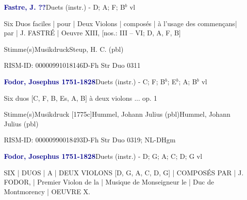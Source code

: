 \documentclass[twocolumn, 12pt]{book}
\begin{document}
\par \vspace{16pt} \textcolor{darkblue}{\textbf{Fastre, J.  ??}}\hfillplus{\textbf{[269]}}\newline Duets (instr.) - D; A; F; B$^b$ vl
\par \begin{itshape}Six Duos faciles | pour | Deux Violons | composés | à l'usage des commençans| par | J. FASTRÉ | Oeuvre XIII, [nos.: III – VI; D, A, F, B]\end{itshape} 
\par \textcolor{darkblue}{}  Stimme(s)\newline Musikdruck\newline Steup, H. C.  (pbl)
\par RISM-ID: 00000991018146\newline D-Fh  Str Duo 0311
\par \vspace{16pt} \textcolor{darkblue}{\textbf{Fodor, Josephus  1751-1828}}\hfillplus{\textbf{[270]}}\newline Duets (instr.) - C; F; B$^b$; E$^b$; A; B$^b$ vl
\par \begin{itshape}Six duos [C, F, B, Es, A, B] à deux violons ... op. 1\end{itshape} 
\par \textcolor{darkblue}{}  Stimme(s)\newline Musikdruck  [1775c]\newline Hummel, Johann Julius  (pbl)\newline Hummel, Johann Julius  (pbl)
\par RISM-ID: 00000990018493\newline D-Fh  Str Duo 0319; NL-DHgm
\par \vspace{16pt} \textcolor{darkblue}{\textbf{Fodor, Josephus  1751-1828}}\hfillplus{\textbf{[271]}}\newline Duets (instr.) - D; G; A; C; D; G vl
\par \begin{itshape}SIX | DUOS | A | DEUX VIOLONS [D, G, A, C, D, G] | COMPOSÉS PAR | J. FODOR, | Premier Violon de la | Musique de Monseigneur le | Duc de Montmorency | OEUVRE X.\end{itshape} 
\end{document}

